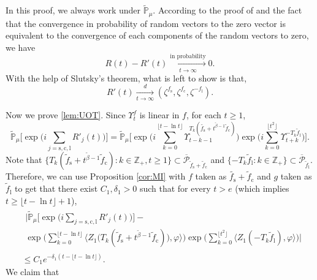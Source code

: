 \documentclass{amse-new}
\numberwithin{equation}{section}
\begin{document}
\begin{prof}
	In this proof, we always work under $\mathbb{\widetilde{P}}_{\mu}$.
	According to the proof of
\cite[Theorem 1.6]{RenSongSunZhao2019Stable} and the fact that the convergence in
 probability of random vectors to the zero vector is equivalent to the convergence of each components of the random vectors to zero, we have
\[
	R(t)-R'(t)
	\xrightarrow[t\to \infty]{\text{in probability}} 0.
\]
	With the help of Slutsky's theorem, what is left to show is that,
\begin{equation} \label{lem:UOT}
	R'(t)
	\xrightarrow[t\to \infty]{d}(\zeta^{f_\mathrm s},\zeta^{f_\mathrm c},\zeta^{-f_\mathrm l}).
\end{equation}

	Now we prove \eqref{lem:UOT}.
	Since $\Upsilon_t^f$ is linear in $f$, for each $t\geq 1$,
\[
        \widetilde{\mathbb P}_{\mu}\Big[\exp\Big(i \sum_{j=\mathrm s,\mathrm c,\mathrm l} R'_j(t)\Big)\Big]
	= \widetilde{\mathbb P}_{\mu}\Big[\exp\Big(i\sum_{k=0}^{\lfloor t-\ln t \rfloor}\Upsilon_{t-k-1}^{T_k(\tilde{f_\mathrm s}+t^{\tilde{\beta}-1} \tilde{f}_{\mathrm c})}\Big)\exp\Big(i\sum_{k=0}^{\lfloor t^2 \rfloor}\Upsilon_{t+k}^{-T_k\tilde{f}_{\mathrm l}}\Big)\Big].
\]
	Note that $\{T_k(\tilde f_\mathrm s + t^{\tilde\beta - 1}\tilde f_{\mathrm c}):k\in \mathbb Z_+, t\geq 1\}\subset \overline{\mathcal P}_{\tilde f_\mathrm s + \tilde f_{\mathrm c}}$ and $\{-T_k\tilde{f}_{\mathrm l}: k\in \mathbb Z_+\}\subset \overline{\mathcal P}_{\tilde f_\mathrm l}$.
	Therefore, we can use Proposition \ref{cor:MI} with $f$
taken as $\tilde{f_\mathrm s}+ \tilde{f}_{\mathrm c}$ and $g$ taken as
	$\tilde{f}_{\mathrm l}$
	to get that there exist $C_1,\delta_1 > 0$ such that for every $t>e$ (which implies $t\geq \lfloor t - \ln t\rfloor +1$),
\begin{align}
       &\begin{multlined}
  	\bigg|\widetilde{\mathbb P}_{\mu}\Big[\exp\Big(i \sum_{j=\mathrm s,\mathrm c,\mathrm l}R'_j(t)\Big)\Big] - {}
  	\\ \exp\Big(\sum_{k=0}^{\lfloor t-\ln t \rfloor} \big\langle Z_1\big(T_{k}(\tilde f_\mathrm s+t^{\tilde{\beta}-1}\tilde{f}_{\mathrm c})\big), \varphi \big\rangle \Big)\exp\Big(\sum_{k=0}^{\lfloor t^2 \rfloor}\langle Z_1(-T_k\tilde{f}_{\mathrm l}),\varphi\rangle\Big)\bigg|
  	\end{multlined}
      \\ &\leq C_1 e^{-\delta_1(t - \lfloor t - \ln t\rfloor)}.
\end{align}
	We claim that
\begin{align}

\end{align}
\end{prof}
\end{document}
